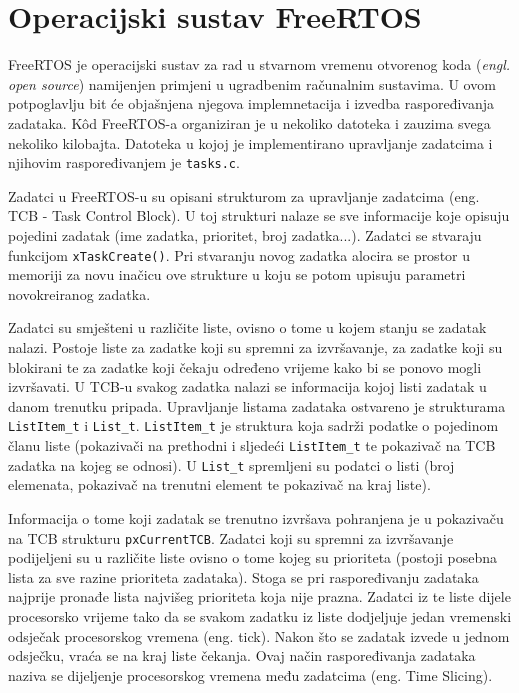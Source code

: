 \documentclass[../zavrsni.tex]{subfiles}
\begin{document}
\sloppy

\justifying

\section{Operacijski sustav FreeRTOS}

FreeRTOS je operacijski sustav za rad u stvarnom vremenu otvorenog koda (\textit{engl. open source}) namijenjen primjeni u ugradbenim 
računalnim sustavima. U ovom potpoglavlju bit će objašnjena 
njegova implemnetacija i izvedba raspoređivanja zadataka. K\^{o}d FreeRTOS-a organiziran je u nekoliko datoteka i zauzima 
svega nekoliko kilobajta. Datoteka u kojoj je implementirano upravljanje zadatcima i njihovim raspoređivanjem je \texttt{tasks.c}.

Zadatci u FreeRTOS-u su opisani strukturom za upravljanje zadatcima (eng. TCB - Task Control Block). U toj strukturi nalaze
se sve informacije koje opisuju pojedini zadatak (ime zadatka, prioritet, broj zadatka...).  
Zadatci se stvaraju funkcijom \texttt{xTaskCreate()}.
Pri stvaranju novog zadatka alocira se prostor u memoriji za novu inačicu 
ove strukture u koju se potom upisuju parametri novokreiranog zadatka.

Zadatci su smješteni u različite liste, ovisno o tome u kojem stanju se zadatak nalazi. Postoje liste za zadatke koji su
spremni za izvršavanje, za zadatke koji su blokirani te za zadatke koji čekaju određeno vrijeme kako bi se ponovo mogli izvršavati.
U TCB-u svakog zadatka nalazi se informacija kojoj listi zadatak u danom trenutku pripada. Upravljanje listama zadataka ostvareno je strukturama
\texttt{ListItem\_t} i \texttt{List\_t}. \texttt{ListItem\_t} je struktura koja sadrži podatke o pojedinom članu liste (pokazivači na prethodni i 
sljedeći \texttt{ListItem\_t} te 
pokazivač na TCB zadatka na kojeg se odnosi). U \texttt{List\_t} spremljeni su podatci o listi (broj elemenata, pokazivač na trenutni element te
pokazivač na kraj liste).

Informacija o tome koji zadatak se trenutno izvršava pohranjena je u pokazivaču na TCB strukturu \texttt{pxCurrentTCB}.
Zadatci koji su spremni za izvršavanje podijeljeni su u različite liste ovisno o tome kojeg su prioriteta (postoji posebna lista
 za sve razine prioriteta zadataka).
Stoga se pri raspoređivanju zadataka najprije pronađe lista najvišeg prioriteta koja nije prazna. Zadatci iz te liste dijele 
procesorsko vrijeme tako da se svakom zadatku iz liste dodjeljuje jedan vremenski odsječak procesorskog vremena (eng. tick).
Nakon što se zadatak izvede u jednom odsječku, vraća se na kraj liste čekanja. Ovaj način raspoređivanja zadataka naziva se dijeljenje
procesorskog vremena među zadatcima (eng. Time Slicing).
\end{document}
